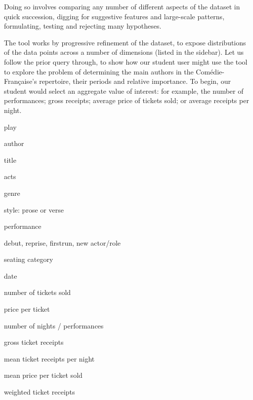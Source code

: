 \documentclass[	DIV=calc,%
							paper=a4,%
							fontsize=11pt,%
							twocolumn]{scrartcl}	 					%
\begin{document}
Doing so involves comparing any number of different aspects of the dataset in quick succession, digging for suggestive features and large-scale patterns, formulating, testing and rejecting many hypotheses.

The tool works by progressive refinement of the dataset, to expose distributions of the data points across a number of dimensions (listed in the sidebar).  Let us follow the prior query through, to show how our student user might use the tool to explore the problem of determining the main authors in the Comédie-Française’s repertoire, their periods and relative importance.  To begin, our student would select an aggregate value of interest: for example, the number of performances; gross receipts; average price of tickets sold; or average receipts per night.

\begin{tcolorbox}
	\fontsize{9pt}{9pt}\selectfont
  \begin{description}[noitemsep,align=left]
		\item[Dimensions]
			\item play
			\item author
			\item title
			\item acts
			\item genre
			\item style: prose or verse
			\item performance
			\item debut, reprise, firstrun, new actor/role
			\item seating category

		\item[Facts]
			\item date
			\item number of tickets sold
			\item price per ticket

		\item[Measures]
			\item number of nights / performances
			\item gross ticket receipts
			\item mean ticket receipts per night
			\item mean price per ticket sold
			\item weighted ticket receipts
  \end{description}
\end{tcolorbox}
\end{document}
